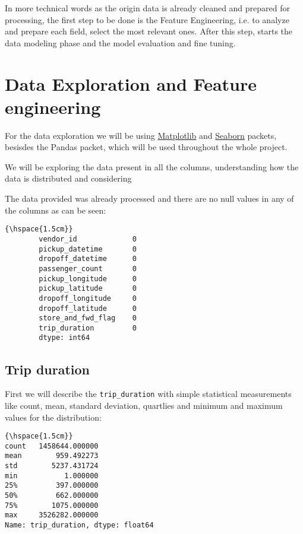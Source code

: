 \documentclass[11pt]{article}
\begin{document}
In more technical words as the origin data is already cleaned and prepared for processing, the first step to be done is the Feature Engineering, i.e. to analyze and prepare each field, select the most relevant ones. After this step, starts the data modeling phase and the model evaluation and fine tuning.
            
\section{Data Exploration and Feature engineering}

\hspace{0.5cm} For the data exploration we will be using \href{https://matplotlib.org/}{Matplotlib} and \href{https://seaborn.pydata.org/}{Seaborn} packets, besisdes the Pandas packet, which will be used throughout the whole project.

We will be exploring the data present in all the columns, understanding how the data is distributed and considering

The data provided was already processed and there are no null values in any of the columns as can be seen:

\begin{Verbatim}[commandchars=\\\{\}]
{\hspace{1.5cm}}
        vendor_id             0
        pickup_datetime       0
        dropoff_datetime      0
        passenger_count       0
        pickup_longitude      0
        pickup_latitude       0
        dropoff_longitude     0
        dropoff_latitude      0
        store_and_fwd_flag    0
        trip_duration         0
        dtype: int64
\end{Verbatim}

\subsection{Trip duration}

\hspace{0.5cm} First we will describe the \texttt{trip\_duration} with simple statistical measurements like count, mean, standard deviation, quartlies and minimum and maximum values for the distribution:

\begin{Verbatim}[commandchars=\\\{\}]
{\hspace{1.5cm}} 
count   1458644.000000
mean        959.492273
std        5237.431724
min           1.000000
25%         397.000000
50%         662.000000
75%        1075.000000
max     3526282.000000
Name: trip_duration, dtype: float64
\end{Verbatim}
\end{document}
